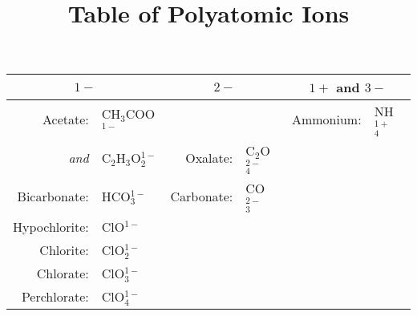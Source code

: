 \documentclass[letterpaper, 12pt]{article}
\title{Table of Polyatomic Ions}
\author{}
\date{}
\begin{document}
    \maketitle
    \begin{center}
        \begin{tabular}{r@{ }l|r@{ }l|r@{ }l}
            \multicolumn{2}{c}{$1-$} & \multicolumn{2}{c}{$2-$} &
            \multicolumn{2}{c}{$1+$ and $3-$} \\
            \hline %
            Acetate:        & CH$_3$COO$^{1-}$      &               &                   & Ammonium:     & NH$^{1+}_4$   \\
            \cline{5-6} %
            \emph{and}      & C$_2$H$_3$O$^{1-}_2$  & Oxalate:      & C$_2$O$^{2-}_4$   &               &               \\
            \cline{1-2} %
            Bicarbonate:    & HCO$^{1-}_3$          & Carbonate:    & CO$^{2-}_3$       &               &               \\
            \cline{1-4} %
            Hypochlorite:   & ClO$^{1-}$            &               &                   &               &               \\
            Chlorite:       & ClO$^{1-}_2$          &               &                   &               &               \\
            Chlorate:       & ClO$^{1-}_3$          &               &                   &               &               \\
            Perchlorate:    & ClO$^{1-}_4$          &               &                   &               &               \\
            \cline{1-2} %

\end{tabular}
\end{center}
\end{document}

